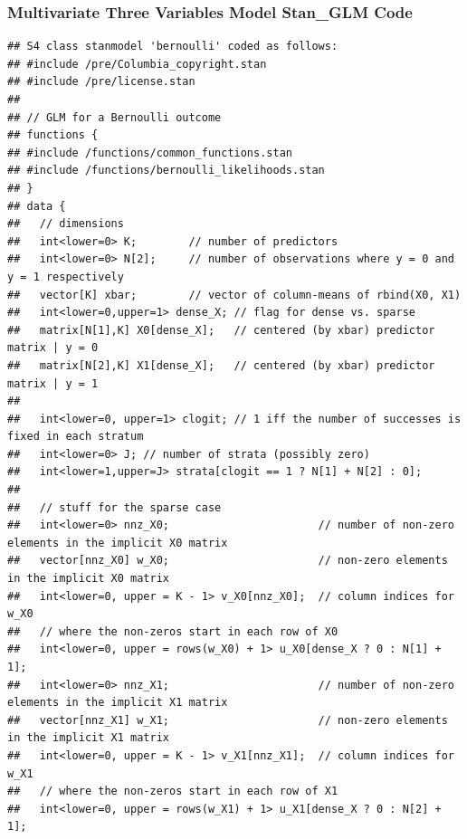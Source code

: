 \documentclass[
]{article}
\newenvironment{Shaded}{\begin{snugshade}}{\end{snugshade}}
\newcommand{\KeywordTok}[1]{\textcolor[rgb]{0.13,0.29,0.53}{\textbf{#1}}}
\newcommand{\NormalTok}[1]{#1}
\newcommand{\OperatorTok}[1]{\textcolor[rgb]{0.81,0.36,0.00}{\textbf{#1}}}
\begin{document}
\hypertarget{multivariate-three-variables-model-stan_glm-code}{%
\subsubsection{Multivariate Three Variables Model Stan\_GLM
Code}\label{multivariate-three-variables-model-stan_glm-code}}

\begin{Shaded}
\end{Shaded}

\begin{verbatim}
## S4 class stanmodel 'bernoulli' coded as follows:
## #include /pre/Columbia_copyright.stan
## #include /pre/license.stan
## 
## // GLM for a Bernoulli outcome
## functions {
## #include /functions/common_functions.stan
## #include /functions/bernoulli_likelihoods.stan
## }
## data {
##   // dimensions
##   int<lower=0> K;        // number of predictors
##   int<lower=0> N[2];     // number of observations where y = 0 and y = 1 respectively
##   vector[K] xbar;        // vector of column-means of rbind(X0, X1)
##   int<lower=0,upper=1> dense_X; // flag for dense vs. sparse
##   matrix[N[1],K] X0[dense_X];   // centered (by xbar) predictor matrix | y = 0
##   matrix[N[2],K] X1[dense_X];   // centered (by xbar) predictor matrix | y = 1
##   
##   int<lower=0, upper=1> clogit; // 1 iff the number of successes is fixed in each stratum
##   int<lower=0> J; // number of strata (possibly zero)
##   int<lower=1,upper=J> strata[clogit == 1 ? N[1] + N[2] : 0];
## 
##   // stuff for the sparse case
##   int<lower=0> nnz_X0;                       // number of non-zero elements in the implicit X0 matrix
##   vector[nnz_X0] w_X0;                       // non-zero elements in the implicit X0 matrix
##   int<lower=0, upper = K - 1> v_X0[nnz_X0];  // column indices for w_X0
##   // where the non-zeros start in each row of X0
##   int<lower=0, upper = rows(w_X0) + 1> u_X0[dense_X ? 0 : N[1] + 1]; 
##   int<lower=0> nnz_X1;                       // number of non-zero elements in the implicit X1 matrix
##   vector[nnz_X1] w_X1;                       // non-zero elements in the implicit X1 matrix
##   int<lower=0, upper = K - 1> v_X1[nnz_X1];  // column indices for w_X1
##   // where the non-zeros start in each row of X1
##   int<lower=0, upper = rows(w_X1) + 1> u_X1[dense_X ? 0 : N[2] + 1]; 

\end{verbatim}
\end{document}
